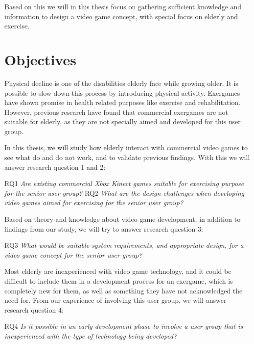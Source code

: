 Based on this we will in this thesis focus on gathering sufficient knowledge and information to design a video game concept, with special focus on elderly and exercise.    

\section{Objectives}
\label{sec:researchq}
Physical decline is one of the disabilities elderly face while growing older. It is possible to slow down this process by introducing physical activity. Exergames have shown promise in health related purposes like exercise and rehabilitation. However, previous research have found that commercial exergames are not suitable for elderly, as they are not specially aimed and developed for this user group. 

In this thesis, we will study how elderly interact with commercial video games to see what do and do not work, and to validate previous findings. With this we will answer research question 1 and 2: 

RQ1 \emph{Are existing commercial Xbox Kinect games suitable for exercising purpose for the senior user group?} 
RQ2 \emph{What are the design challenges when developing video games aimed for exercising for the senior user group?}

Based on theory and knowledge about video game development, in addition to findings from our study, we will try to answer research question 3:

RQ3 \emph{What would be suitable system requirements, and appropriate design, for a video game concept for the senior user group?}

Most elderly are inexperienced with video game technology, and it could be difficult to include them in a development process for an exergame, which is completely new for them, as well as something they have not acknowledged the need for. From our experience of involving this user group, we will answer research question 4:

RQ4 \emph{Is it possible in an early development phase to involve a user group that is inexperienced with the type of technology being developed?}

